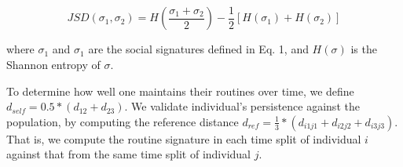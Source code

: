 \documentclass[pdflatex,sn-vancouver,Numbered]{bst/sn-jnl}%
\theoremstyle{thmstyleone}%
\theoremstyle{thmstyletwo}%
\theoremstyle{thmstylethree}%
\begin{document}
\begin{equation}
JSD(\sigma_1, \sigma_2) = H(\frac{\sigma_1 + \sigma_2}{2}) - \frac{1}{2}[H(\sigma_1) + H(\sigma_2)]
\end{equation}

where $\sigma_1$ and $\sigma_1$ are the social signatures defined in Eq. 1, and $H(\sigma)$ is the Shannon entropy of $\sigma$.

To determine how well one maintains their routines over time, we define $d_{self} = 0.5 * (d_{12} + d_{23})$. We validate individual's persistence against the population, by computing the reference distance $d_{ref} = \frac{1}{3}* (d_{i1j1} + d_{i2j2}  + d_{i3j3} )$. That is, we compute the routine signature in each time split of individual $i$ against that from the same time split of individual $j$.


%


\end{document}
